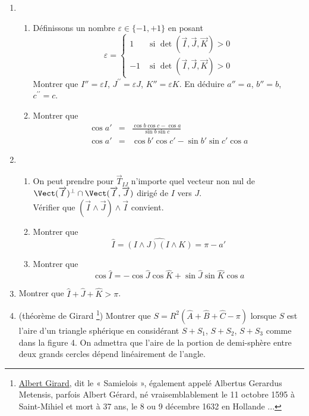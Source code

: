 \begin{enumerate}
\item
  \begin{enumerate}
\item  D{\'e}finissons un nombre $\varepsilon \in\{-1,+1\}$ en posant
\begin{displaymath}
 \varepsilon =
\left\lbrace 
\begin{aligned}
 1 &\text{ si } \det(\overrightarrow I,\overrightarrow J,\overrightarrow K) >0 \\
-1 &\text{ si } \det(\overrightarrow I,\overrightarrow J,\overrightarrow K) >0 
\end{aligned}
\right. 
\end{displaymath}
Montrer que $I''=\varepsilon I$,
$J^{\prime \prime
}=\varepsilon J$, $K''=\varepsilon K$. En d{\'e}duire $%
a''=a$, $b''=b$, $c^{\prime \prime
}=c$.

\item  Montrer que
\begin{eqnarray*}
\cos a' &=&\frac{\cos b\cos c-\cos a}{\sin b\sin c} \\
\cos a' &=&\cos b'\cos c'-\sin
b'\sin c'\cos a
\end{eqnarray*}
    \end{enumerate}

\item
  \begin{enumerate}
\item  On peut prendre pour $\overrightarrow{T}_{IJ}$ n'importe quel vecteur non nul de $\Vect(\overrightarrow I)^{\perp }\cap \Vect(\overrightarrow I,\overrightarrow J)$ dirig{\'e} de $I$ vers $J$. \\
V{\'e}rifier que $(\overrightarrow I\wedge \overrightarrow J)\wedge \overrightarrow I$ convient.

\item  Montrer que 
\begin{displaymath}
 \widehat{I}=\widehat{(I\wedge J)(I\wedge K)}=\pi-a'
\end{displaymath}

\item  Montrer que
\[
\cos \widehat{I}=-\cos \widehat{J}\cos \widehat{K}+\sin
\widehat{J}\sin \widehat{K}\cos a
\]
  \end{enumerate}

\item  Montrer que $\widehat{I}+\widehat{J}+\widehat{K}>\pi $.
\item (théorème de Girard \footnote{\href{http://fr.wikipedia.org/wiki/Albert_Girard}{Albert Girard}, dit le « Samielois », également appelé Albertus Gerardus Metensis, parfois Albert Gérard, né vraisemblablement le 11 octobre 1595 à Saint-Mihiel et mort à 37 ans, le 8 ou 9 décembre 1632 en Hollande ...})\newline
Montrer que $S=R^2(\widehat{A}+\widehat{B}+\widehat{C}-\pi) $ lorsque $S$ est l'aire d'un triangle sphérique en considérant $S+S_1$, $S+S_2$, $S+S_3$ comme dans la figure 4. On admettra que l'aire de la portion de demi-sphère entre deux grands cercles dépend linéairement de l'angle.
\end{enumerate}